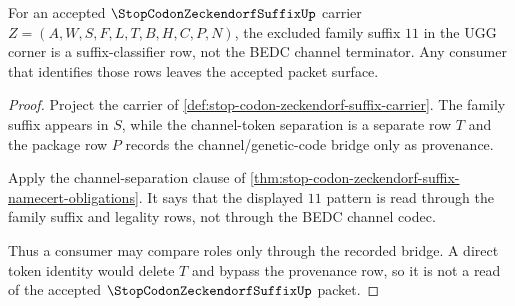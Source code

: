 \begin{theorem}
\label{thm:stop-codon-zeckendorf-suffix-no-channel-token-collapse}
For an accepted $\StopCodonZeckendorfSuffixUp$ carrier $Z=(A,W,S,F,L,T,B,H,C,P,N)$, the excluded family suffix $11$ in the $\mathrm{UGG}$ corner is a suffix-classifier row, not the BEDC channel terminator. Any consumer that identifies those rows leaves the accepted packet surface.
\end{theorem}
\begin{proof}
Project the carrier of \autoref{def:stop-codon-zeckendorf-suffix-carrier}. The family suffix appears in $S$, while the channel-token separation is a separate row $T$ and the package row $P$ records the channel/genetic-code bridge only as provenance.

Apply the channel-separation clause of \autoref{thm:stop-codon-zeckendorf-suffix-namecert-obligations}. It says that the displayed $11$ pattern is read through the family suffix and legality rows, not through the BEDC channel codec.

Thus a consumer may compare roles only through the recorded bridge. A direct token identity would delete $T$ and bypass the provenance row, so it is not a read of the accepted $\StopCodonZeckendorfSuffixUp$ packet.
\end{proof}


